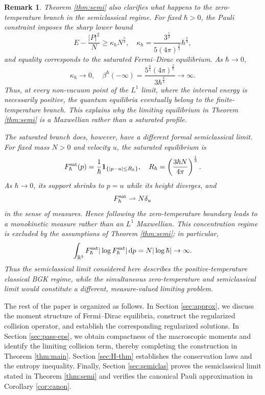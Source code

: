 \documentclass[10pt,reqno]{amsart}
\numberwithin{equation}{section}
\newtheorem{remark}{Remark}[section]
\theoremstyle{definition}
\newcommand{\R}{\mathbb R}
\newcommand{\dpp}{\mathrm{d}p}
\newcommand{\kappah}{\kappa_{\hbar}}
\newcommand{\one}{\mathbf 1}
\newcommand{\lt}{\left}
\newcommand{\rt}{\right}
\begin{document}
\begin{remark} 
Theorem \ref{thm:semi} also clarifies what happens to the zero-temperature branch in the semiclassical regime.  For fixed $\hbar>0$, the Pauli constraint imposes the sharp lower bound
\[
 E-\frac{|P|^2}{N}  \geq  \kappah N^{\frac53},  \quad  \kappah  =  \frac{3^{\frac53}}{5(4\pi)^{\frac23}}\hbar^{\frac23},
\]
and equality corresponds to the saturated Fermi--Dirac equilibrium.  As $\hbar\to0$,
\[
 \kappah\to0,  \quad  \beta^{\hbar}(-\infty)  =  \frac{5^{\frac35}(4\pi)^{\frac25}}  {3\hbar^{\frac25}}  \to\infty.
\]
Thus, at every non-vacuum point of the $L^1$ limit, where the internal energy is necessarily positive, the quantum equilibria eventually belong to the finite-temperature branch.  This explains why the limiting equilibrium in Theorem \ref{thm:semi} is a Maxwellian rather than a saturated profile.

The saturated branch does, however, have a different formal semiclassical limit.  For fixed mass $N>0$ and velocity $u$, the saturated equilibrium is
\[
 F_\hbar^{\rm sat}(p)  =  \frac1\hbar  \one_{\{|p-u|\leq R_\hbar\}},  \quad  R_\hbar  =  \lt(\frac{3\hbar N}{4\pi}\rt)^{\frac13}.
\]
As $\hbar\to0$, its support shrinks to $p=u$ while its height diverges, and
\[
 F_\hbar^{\rm sat}  \rightharpoonup N\delta_u
\]
in the sense of measures.  Hence following the zero-temperature boundary leads to a monokinetic measure rather than an $L^1$ Maxwellian.  This concentration regime is excluded by the assumptions of Theorem \ref{thm:semi}; in particular,
\[
 \int_{\R^3}  F_\hbar^{\rm sat}  |\log F_\hbar^{\rm sat}|\,\dpp  =  N|\log\hbar|  \to \infty.
\]
Thus the semiclassical limit considered here describes the positive-temperature classical BGK regime, while the simultaneous zero-temperature and semiclassical limit would constitute a different, measure-valued limiting problem.
\end{remark}
 

The rest of the paper is organized as follows. In Section \ref{sec:approx}, we discuss the moment structure of Fermi--Dirac equilibria, construct the regularized collision operator, and establish the corresponding regularized solutions. In Section \ref{sec:pass-eps}, we obtain compactness of the macroscopic moments and identify the limiting collision term, thereby completing the construction in Theorem \ref{thm:main}.  Section \ref{sec:H-thm} establishes the conservation laws and the entropy inequality.  Finally, Section \ref{sec:semiclas} proves the semiclassical limit stated in Theorem \ref{thm:semi} and verifies the canonical Pauli approximation in Corollary \ref{cor:canon}.
\end{document}
